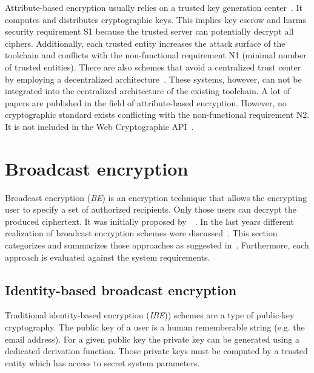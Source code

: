 \documentclass[../main.tex]{subfiles}
\begin{document}
Attribute-based encryption usually relies on a trusted key generation center~\cite{Sahai2009}.
It computes and distributes cryptographic keys.
This implies key escrow and harms security requirement S1 because the trusted server can potentially decrypt all ciphers.
Additionally, each trusted entity increases the attack surface of the toolchain and conflicts with the non-functional requirement N1 (minimal number of trusted entities).
There are also schemes that avoid a centralized trust center by employing a decentralized architecture~\cite{Vaanchig2018}.
These systems, however, can not be integrated into the centralized architecture of the existing toolchain.
A lot of papers are published in the field of attribute-based encryption.
However, no cryptographic standard exists conflicting with the non-functional requirement N2.
It is not included in the Web Cryptographic API~\cite{WebCryptoApi2017}.

\section{Broadcast encryption}
\label{sec:broadcast-encryption}

Broadcast encryption (\textit{BE}) is an encryption technique that allows the encrypting user to specify a set of authorized recipients.
Only those users can decrypt the produced ciphertext.
It was initially proposed by~\citeauthor{fiat1993broadcast}~\cite{fiat1993broadcast}.
In the last years different realization of broadcast encryption schemes were discussed~\cite{Sakai2007, Li2018, Hagg2022, Fan2013}.
This section categorizes and summarizes those approaches as suggested in~\cite{Hagg2022}.
Furthermore, each approach is evaluated against the system requirements.

\subsection{Identity-based broadcast encryption} 
\label{sec:broadcast-identity}

Traditional identity-based encryption (\textit{IBE})) schemes are  a type of public-key cryptography.
The public key of a user is a human rememberable string (e.g. the email address).
For a given public key the private key can be generated using a dedicated derivation function.
Those private keys must be computed by a trusted entity which has access to secret system parameters.~\cite{shamir1985}
\end{document}

